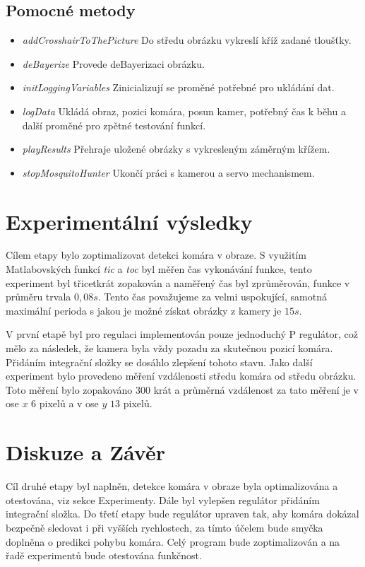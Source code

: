 \documentclass[a4paper,10pt]{article}
\begin{document}

\subsection{Pomocné metody}

		\begin{itemize}
				\item \textit{addCrosshairToThePicture} Do středu obrázku vykreslí kříž zadané tloušťky. 
				\item \textit{deBayerize} Provede deBayerizaci obrázku.
				\item \textit{initLoggingVariables} Zinicializují se proměné potřebné pro ukládání dat.
				\item \textit{logData} Ukládá obraz, pozici komára, posun kamer, potřebný čas k běhu a další proměné pro zpětné testování funkcí.
				\item \textit{playResults} Přehraje uložené obrázky s vykresleným záměrným křížem.
				\item \textit{stopMosquitoHunter} Ukončí práci s kamerou a servo mechanismem.
		\end{itemize}

\section{Experimentální výsledky}
		Cílem etapy bylo zoptimalizovat detekci komára v obraze. 
		S využitím Matlabovských funkcí \textit{tic} a \textit{toc} byl měřen čas vykonávání funkce, 
		tento experiment byl třicetkrát zopakován a naměřený čas byl zprůměrován, funkce v průměru trvala $0,08 s$. 
		Tento čas považujeme za velmi uspokující, samotná maximální perioda s jakou je možné získat obrázky z kamery je $15 s$. 

		V první etapě byl pro regulaci implementován pouze jednoduchý P regulátor, což mělo za následek, 
		že kamera byla vždy pozadu za skutečnou pozicí komára. Přidáním integrační složky se dosáhlo zlepšení tohoto stavu. 
		Jako další experiment bylo provedeno měření vzdálenosti středu komára od středu obrázku. 
		Toto měření bylo zopakováno 300 krát a průměrná vzdálenost za tato měření je v ose $x$ $6$ pixelů a v ose $y$ $13$ pixelů.



\section{Diskuze a Závěr}
		Cíl druhé etapy byl naplněn, detekce komára v obraze byla optimalizována a otestována, viz sekce Experimenty. 
		Dále byl vylepšen regulátor přidáním integrační složka. Do třetí etapy bude regulátor upraven tak, 
		aby komára dokázal bezpečně sledovat i při vyšších rychlostech, za tímto účelem bude smyčka doplněna o 
		predikci pohybu komára. Celý program bude zoptimalizován a na řadě experimentů bude otestována funkčnost. 



\end{document}
